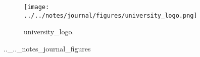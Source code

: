 \begin{figure}[!htbp]
   \centering
\begin{subfigure}[t]{0.48\textwidth}
   \texttt{[image: ../../notes/journal/figures/university\_logo.png]}
   \caption{university_logo.}
   \label{fig:.._.._notes_journal_figures-a}
\end{subfigure}
   \caption{.._.._notes_journal_figures}
   \label{fig:.._.._notes_journal_figures}
\end{figure}